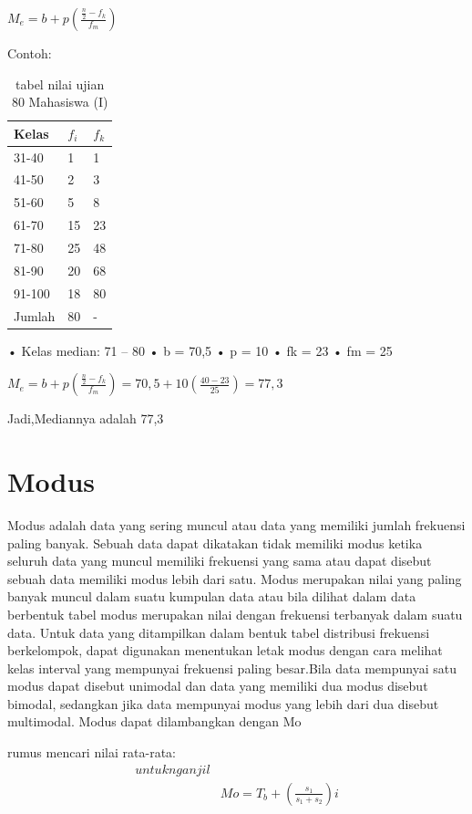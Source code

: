 \documentclass[11pt,fleqn]{book} %
\begin{document}
{$M_{e} = b + p(\frac{\frac{n}{2}-f_{k}}{f_{m}})$

Contoh: 

\begin{table}[h]
\centering
\begin{tabular}{l l l}
\toprule
\textbf{Kelas} & \textbf{$f_{i}$} & \textbf{$f_{k}$}\\
\midrule
31-40 & 1 & 1\\
41-50 & 2 & 3\\
51-60 & 5 & 8\\
61-70 & 15 & 23\\
71-80 & 25 & 48\\
81-90 & 20 & 68\\
91-100 & 18 & 80\\
Jumlah & 80 & - \\
\bottomrule
\end{tabular}
\caption{tabel nilai ujian 80 Mahasiswa (I)}
\end{table}

•	Kelas median: 71 – 80 
•	b = 70,5
•	p = 10
•	fk = 23
•	fm = 25

$M_{e} = b + p(\frac{\frac{n}{2}-f_{k}}{f_{m}}) = 70,5 + 10(\frac{40-23}{25}) = 77,3 $

Jadi,Mediannya adalah 77,3


\section{Modus}

Modus adalah data yang sering muncul atau data yang memiliki jumlah frekuensi paling banyak. Sebuah data dapat dikatakan tidak memiliki modus ketika seluruh data yang muncul memiliki frekuensi yang sama atau dapat disebut sebuah data memiliki modus lebih dari satu.
Modus merupakan nilai yang paling banyak muncul dalam suatu kumpulan data atau bila dilihat dalam data berbentuk tabel modus merupakan nilai dengan frekuensi terbanyak dalam suatu data.
Untuk data yang ditampilkan dalam bentuk tabel distribusi frekuensi berkelompok, dapat digunakan menentukan letak modus dengan cara melihat kelas interval yang mempunyai frekuensi paling besar.Bila data mempunyai satu modus dapat disebut unimodal dan data yang memiliki dua modus disebut bimodal, sedangkan jika data mempunyai modus yang lebih dari dua disebut multimodal. Modus dapat dilambangkan dengan Mo

\begin{theorem}[Modus]
rumus mencari nilai rata-rata:
\begin{align}
untuk n ganjil\\
& Mo = T_{b}+(\frac{s_{1}}{s_{1}+s_{2}})i
\end{align}
\end{theorem}

}
\end{document}
